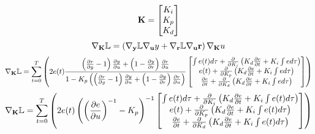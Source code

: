 \documentclass[letterpaper]{article}
\begin{document}
$$\bold{K}=
\begin{bmatrix}
    K_i \\
    K_p \\
    K_d
\end{bmatrix}$$
$$\nabla_{\bold{K}}\mathbb{L}=\left(\nabla_{\bold{y}}\mathbb{L}\nabla_{\bold{u}}{y}+\nabla_{\bold{r}}{\mathbb{L}}\nabla_\bold{u}{\bold{r}}\right)\nabla_{\bold{K}}u$$
$$\nabla_\bold{K}{\mathbb{L}}=\sum_{t=0}^{T}{\left(2e(t)\frac{\left(\frac{\partial r}{\partial y}-1\right)\frac{\partial y}{\partial u}+\left(1-\frac{\partial y}{\partial r}\right)\frac{\partial r}{\partial u}}{1-K_p\left(\left(\frac{\partial r}{\partial y}-1\right)\frac{\partial y}{\partial u}+\left(1-\frac{\partial y}{\partial r}\right)\frac{\partial r}{\partial u}\right)}
\begin{bmatrix}
    \int{e(t)d\tau}+\frac{\partial}{\partial K_i}\left(K_d\frac{\partial e}{\partial t}+K_i\int{ed\tau}\right) \\
    e(t)+\frac{\partial}{\partial K_p}\left(K_d\frac{\partial e}{\partial t}+K_i\int{ed\tau}\right) \\
    \frac{\partial e}{\partial t}+\frac{\partial}{\partial K_d}\left(K_d\frac{\partial e}{\partial t}+K_i\int{ed\tau}\right)
\end{bmatrix}\right)}$$
$$\nabla_\bold{K}{\mathbb{L}}=\sum_{t=0}^{T}{\left(2e(t)\left(\left(\frac{\partial e}{\partial u}\right)^{-1}-K_p\right)^{-1}
\begin{bmatrix}
    \int{e(t)d\tau}+\frac{\partial}{\partial K_i}\left(K_d\frac{\partial e}{\partial t}+K_i\int{e(t)d\tau}\right) \\
    e(t)+\frac{\partial}{\partial K_p}\left(K_d\frac{\partial e}{\partial t}+K_i\int{e(t)d\tau}\right) \\
    \frac{\partial e}{\partial t}+\frac{\partial}{\partial K_d}\left(K_d\frac{\partial e}{\partial t}+K_i\int{e(t)d\tau}\right)
\end{bmatrix}\right)}$$
\end{document}
